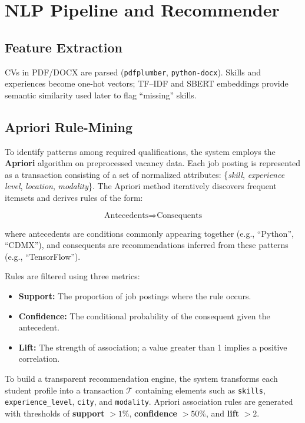 \documentclass[12pt,a4paper]{article}
\begin{document}
	\section{NLP Pipeline and Recommender}
	\subsection{Feature Extraction}
	CVs in PDF/DOCX are parsed (\texttt{pdfplumber}, \texttt{python-docx}). Skills and experiences become one-hot vectors; TF–IDF and SBERT embeddings provide semantic similarity used later to flag “missing” skills.
	
	\subsection{Apriori Rule-Mining}
	
	To identify patterns among required qualifications, the system employs the \textbf{Apriori} algorithm on preprocessed vacancy data. Each job posting is represented as a transaction consisting of a set of normalized attributes: \{\emph{skill}, \emph{experience level}, \emph{location}, \emph{modality}\}. The Apriori method iteratively discovers frequent itemsets and derives rules of the form:
	
	\[
	\text{Antecedents} \Rightarrow \text{Consequents}
	\]
	
	where antecedents are conditions commonly appearing together (e.g., ``Python'', ``CDMX''), and consequents are recommendations inferred from these patterns (e.g., ``TensorFlow'').
	
	Rules are filtered using three metrics:
	\begin{itemize}
		\item \textbf{Support:} The proportion of job postings where the rule occurs.
		\item \textbf{Confidence:} The conditional probability of the consequent given the antecedent.
		\item \textbf{Lift:} The strength of association; a value greater than 1 implies a positive correlation.
	\end{itemize}
	
	To build a transparent recommendation engine, the system transforms each student profile into a transaction $\mathcal{T}$ containing elements such as \texttt{skills}, \texttt{experience\_level}, \texttt{city}, and \texttt{modality}. Apriori association rules are generated with thresholds of \textbf{support} $> 1\%$, \textbf{confidence} $> 50\%$, and \textbf{lift} $> 2$. 
	
\end{document}
